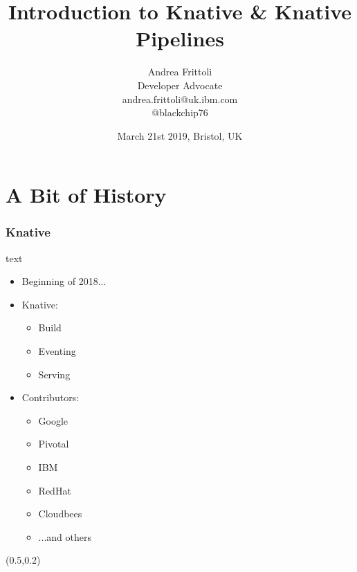 \documentclass[aspectratio=169,11pt,hyperref={colorlinks=true}]{beamer}
\title{Introduction to Knative \& Knative Pipelines}
\date[SRE Meetup Bristol Meetup]{March 21st 2019, Bristol, UK}
\author[Andrea]{
  Andrea Frittoli \\
  Developer Advocate \\
  andrea.frittoli@uk.ibm.com \\
  @blackchip76
}
\institute[DevOpsMeetupSingapore]{
  SRE Meetup Bristol
}
\begin{document}
\begin{frame}[noframenumbering]
\titlepage{}
\end{frame}



\section{A Bit of History}

\begin{lblackrwhiteframe}
  \frametitle{Knative}
  \large
  \begin{beamercolorbox}[wd=0.3\paperwidth]{text}
    \begin{itemize}
      \item Beginning of 2018...
      \item Knative:
      \begin{itemize}
        \item Build
        \item Eventing
        \item Serving
      \end{itemize}
    \end{itemize}
    \begin{itemize}
      \item Contributors:
      \begin{itemize}
        \item Google
        \item Pivotal
        \item IBM
        \item RedHat
        \item Cloudbees
        \item ...and others
      \end{itemize}
    \end{itemize}
  \end{beamercolorbox}%
  \begin{textblock*}{0.5\paperwidth}(0.5\paperwidth,0.2\paperheight)
    \centering

\end{textblock*}
\end{lblackrwhiteframe}
\end{document}
